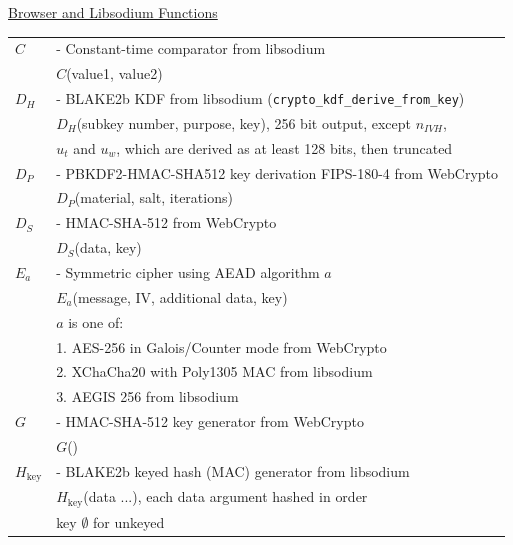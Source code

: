 \documentclass{article}
\newlength{\stanzagap}
\newlength{\stanzawidth}
\newlength{\stanzabox}
\newenvironment{stanza}[1][\stanzawidth]
  {\par\addvspace{\stanzagap}%
   \setlength{\stanzabox}{\dimexpr\linewidth-\parindent\relax}%
   \ifdim\stanzabox>#1\setlength{\stanzabox}{#1}\fi
   \noindent\hspace*{\parindent}\begin{minipage}{\stanzabox}}
  {\end{minipage}\par\addvspace{\stanzagap}}
\begin{document}
\begin{stanza}
\underline{Browser and Libsodium Functions}\\

\begin{tabular}{@{}p{5mm} l}
$C$ & \textrm{ - Constant-time comparator from libsodium} \\
& \phantom{\textrm{ - }}$C$\textrm{(value1, value2)} \\
$D_H$ & \textrm{ - BLAKE2b KDF from libsodium (}\texttt{crypto\_kdf\_derive\_from\_key}\textrm{)} \\
& \phantom{\textrm{ - }}$D_H$\textrm{(subkey number, purpose, key), 256 bit output, except }$n_{\mathit{IVH}}$\textrm{,} \\
& \phantom{\textrm{ - }}$u_t$\textrm{ and }$u_w$\textrm{, which are derived as at least 128 bits, then truncated} \\
$D_P$ & \textrm{ - PBKDF2-HMAC-SHA512 key derivation FIPS-180-4 from WebCrypto} \\
& \phantom{\textrm{ - }}$D_P$\textrm{(material, salt, iterations)} \\
$D_S$ & \textrm{ - HMAC-SHA-512 from WebCrypto} \\
& \phantom{\textrm{ - }}$D_S$\textrm{(data, key)} \\
$E_a$ & \textrm{ - Symmetric cipher using AEAD algorithm }$a$ \\
& \phantom{\textrm{ - }}$E_a$\textrm{(message, IV, additional data, key)} \\
& \phantom{\textrm{ - }}$a$\textrm{ is one of:}\\
& \hspace{23pt}\textrm{1. AES-256 in Galois/Counter mode from WebCrypto} \\
& \hspace{23pt}\textrm{2. XChaCha20 with Poly1305 MAC from libsodium} \\
& \hspace{23pt}\textrm{3. AEGIS 256 from libsodium} \\
$G$ & \textrm{ - HMAC-SHA-512 key generator from WebCrypto}\\
& \phantom{\textrm{ - }}$G$\textrm{()} \\
$H_{\textrm{key}}$ & \textrm{ - BLAKE2b keyed hash (MAC) generator from libsodium} \\
& \phantom{\textrm{ - }}$H_{\textrm{key}}$\textrm{(data ...), each data argument hashed in order} \\
& \phantom{\textrm{ - }}\textrm{key }$\emptyset$\textrm{ for unkeyed} \\

\end{tabular}
\end{stanza}
\end{document}
